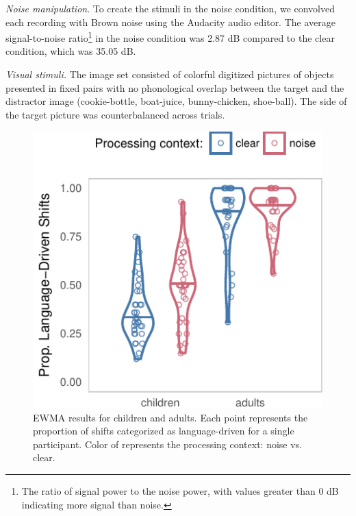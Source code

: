 \documentclass[10pt, letterpaper]{article}
\newenvironment{CodeChunk}{}{}
\begin{document}
\emph{Noise manipulation}. To create the stimuli in the noise condition,
we convolved each recording with Brown noise using the Audacity audio
editor. The average signal-to-noise ratio\footnote{The ratio of signal
  power to the noise power, with values greater than 0 dB indicating
  more signal than noise.} in the noise condition was 2.87 dB compared
to the clear condition, which was 35.05 dB.

\emph{Visual stimuli.} The image set consisted of colorful digitized
pictures of objects presented in fixed pairs with no phonological
overlap between the target and the distractor image (cookie-bottle,
boat-juice, bunny-chicken, shoe-ball). The side of the target picture
was counterbalanced across trials.

\begin{CodeChunk}
\begin{figure}[t]

{\centering \includegraphics[width=0.8\linewidth]{figs/ewma_violin_plot-1} 

}

\caption[EWMA results for children and adults]{EWMA results for children and adults. Each point represents the proportion of shifts categorized as language-driven for a single participant. Color of represents the processing context: noise vs. clear.}\label{fig:ewma_violin_plot}
\end{figure}
\end{CodeChunk}
\end{document}
